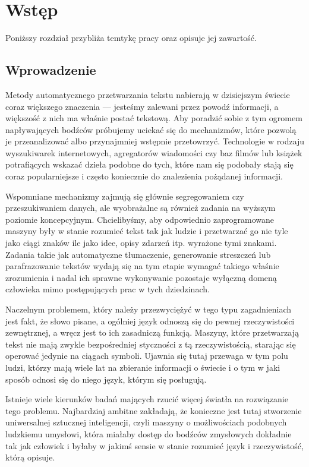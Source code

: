 \documentclass[11pt,a4paper]{article}
\begin{document}
\tableofcontents
\pagebreak

\section{Wstęp}

Poniższy rozdział przybliża temtykę pracy oraz opisuje jej zawartość.

\subsection{Wprowadzenie}

Metody automatycznego przetwarzania tekstu nabierają w dzisiejszym świecie
coraz większego znaczenia --- jesteśmy zalewani przez powodź informacji, a
większość z nich ma właśnie postać tekstową. Aby poradzić sobie z tym ogromem
napływających bodźców próbujemy uciekać się do mechanizmów, które pozwolą je
przeanalizować albo przynajmniej wstępnie przetowrzyć. Technologie w rodzaju
wyszukiwarek internetowych, agregatorów wiadomości czy baz filmów lub książek
potrafiących wskazać dzieła podobne do tych, które nam się podobały stają się
coraz popularniejsze i często koniecznie do znalezienia pożądanej informacji.

Wspomniane mechanizmy zajmują się głównie segregowaniem czy przeszukiwaniem
danych, ale wyobrażalne są również zadania na wyższym poziomie koncepcyjnym.
Chcielibyśmy, aby odpowiednio zaprogramowane maszyny były w stanie rozumieć
tekst tak jak ludzie i przetwarzać go nie tyle jako ciągi znaków ile jako idee,
opisy zdarzeń itp. wyrażone tymi znakami. Zadania takie jak automatyczne
tłumaczenie, generowanie streszczeń lub parafrazowanie tekstów wydają się na
tym etapie wymagać takiego właśnie zrozumienia i nadal ich sprawne wykonywanie
pozostaje wyłączną domeną człowieka mimo postępujących prac w tych
dziedzinach.

Naczelnym problemem, który należy przezwyciężyć w tego typu zagadnieniach jest
fakt, że słowo pisane, a ogólniej język odnoszą się do pewnej rzeczywistości
zewnętrznej, a wręcz jest to ich zasadniczą funkcją. Maszyny, które
przetwarzają tekst nie mają zwykle bezpośredniej styczności z tą
rzeczywistością, starając się operować jedynie na ciągach symboli. Ujawnia się
tutaj przewaga w tym polu ludzi, którzy mają wiele lat na zbieranie informacji
o świecie i o tym w jaki sposób odnosi się do niego język, którym się
posługują.

Istnieje wiele kierunków badań mających rzucić więcej światła na rozwiązanie
tego problemu. Najbardziaj ambitne zakładają, że konieczne jest tutaj
stworzenie uniwersalnej sztucznej inteligencji, czyli maszyny o możliwościach
podobnych ludzkiemu umysłowi, która miałaby dostęp do bodźców zmysłowych
dokładnie tak jak człowiek i byłaby w jakimś sensie w stanie rozumieć
język i rzeczywistość, którą opisuje.
\end{document}
